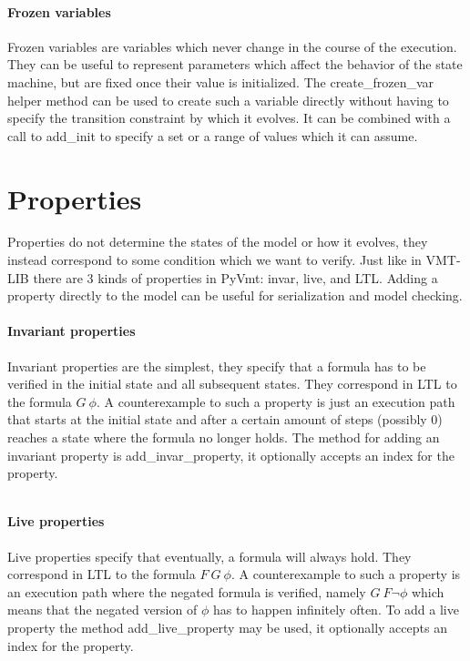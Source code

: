 \paragraph*{Frozen variables}
Frozen variables are variables which never change in the course of the execution.
They can be useful to represent parameters which affect the behavior of the state machine, but are fixed once their value is initialized.
The create\_frozen\_var helper method can be used to create such a variable directly without having to specify the transition constraint by which it evolves. It can be combined with a call to add\_init to specify a set or a range of values which it can assume.

\section{Properties}
Properties do not determine the states of the model or how it evolves, they instead correspond to some condition which we want to verify.
Just like in VMT-LIB there are 3 kinds of properties in PyVmt: invar, live, and LTL.
Adding a property directly to the model can be useful for serialization and model checking.

\paragraph*{Invariant properties}
Invariant properties are the simplest, they specify that a formula has to be verified in the initial state and all subsequent states.
They correspond in LTL to the formula \begin{math} G\ \phi \end{math}.
A counterexample to such a property is just an execution path that starts at the initial state and after a certain amount of steps (possibly 0) reaches a state where the formula no longer holds.
The method for adding an invariant property is add\_invar\_property, it optionally accepts an index for the property.

\inputminted[firstline=66, lastline=73]{python}{py/modelling.py}

\paragraph*{Live properties}
Live properties specify that eventually, a formula will always hold.
They correspond in LTL to the formula \begin{math} F\ G\ \phi \end{math}.
A counterexample to such a property is an execution path where the negated formula is verified, namely \begin{math} G\ F \lnot \phi \end{math} which means that the negated version of \begin{math} \phi \end{math} has to happen infinitely often.
To add a live property the method add\_live\_property may be used, it optionally accepts an index for the property.

